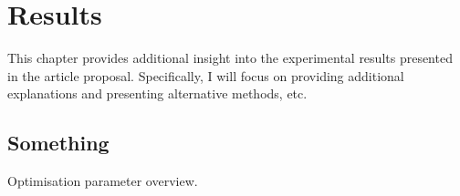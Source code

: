 \chapter{Results}
This chapter provides additional insight into the experimental results presented in the article proposal. Specifically, I will focus on providing additional explanations and presenting alternative methods, etc.

\section{Something}

\begin{table}[]
    \centering

    

    \caption{Optimisation parameter overview.}
    \label{tab:parameters}
\end{table}